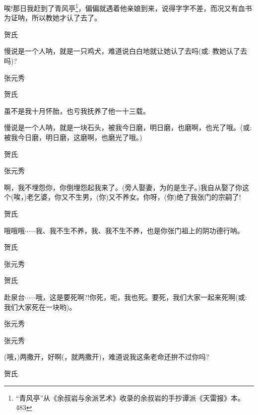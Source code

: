 唉!那日我赶到了青风亭\footnote{ ``青风亭''从《余叔岩与余派艺术》收录的余叔岩的手抄谭派《天雷报》本。{483}}，偏偏就遇着他亲娘到来，说得字字不差，而况又有血书为证呐，所以教她才认了去了。

贺氏

慢说是一个人呐，就是一只鸡犬，难道说白白地就让她认了去吗({\akai 或}: 教她认了去吗)?

张元秀


贺氏\hspace{30pt}~

虽不是我十月怀胎，也亏我抚养了他一十三载。

慢说是一个人呐，就是一块石头，被我今日磨，明日磨，也磨啊，也光了哦。({\akai 或}: 被我今日磨，明日磨，这磨啊，也磨光了哦。)

贺氏


张元秀

啊，我不埋怨你，你倒埋怨起我来了。(旁人娶妻，为的是生子。)我自从娶了你这个(唉，)老乞婆，你又不生男，(你)又不养女。你呀，(你)绝了我张门的宗嗣了!

贺氏

哦哦哦$\cdots{}\cdots{}$我、我不生不养，我、我不生不养，也是你张门祖上的阴功德行呐。

贺氏


张元秀


贺氏

赴泉台$\cdots{}\cdots{}$哦，这是要死啊?!你死，呃，我也死。要死，我们大家一起来死啊({\akai 或}: 我们大家死在一块哟)。

张元秀


张元秀\hspace{20pt}~

(哦，)两撒开，好啊(，就两撒开)，难道说我这条老命还拚不过你吗?

贺氏\hspace{30pt}~

